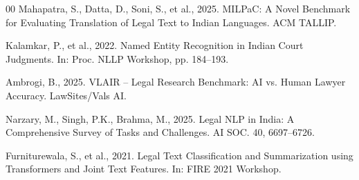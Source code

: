 \documentclass[preprint,12pt]{elsarticle}
\begin{document}
\begin{thebibliography}{00}
Mahapatra, S., Datta, D., Soni, S., et al., 2025. MILPaC: A Novel Benchmark for Evaluating Translation of Legal Text to Indian Languages. ACM TALLIP.

Kalamkar, P., et al., 2022. Named Entity Recognition in Indian Court Judgments. In: Proc. NLLP Workshop, pp. 184--193.

Ambrogi, B., 2025. VLAIR – Legal Research Benchmark: AI vs. Human Lawyer Accuracy. LawSites/Vals AI.

Narzary, M., Singh, P.K., Brahma, M., 2025. Legal NLP in India: A Comprehensive Survey of Tasks and Challenges. AI SOC. 40, 6697--6726.

Furniturewala, S., et al., 2021. Legal Text Classification and Summarization using Transformers and Joint Text Features. In: FIRE 2021 Workshop.

\end{thebibliography}
\end{document}
